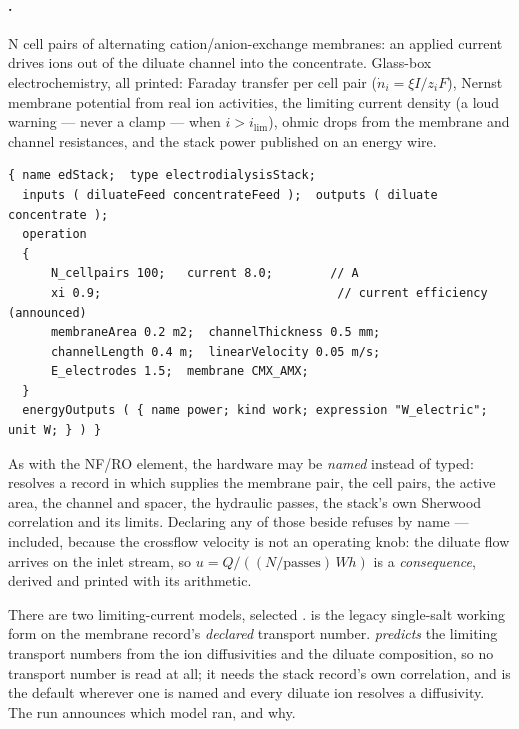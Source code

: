 \documentclass[11pt,a4paper]{article}
\begin{document}
\paragraph{.}  N cell pairs of alternating
cation/anion-exchange membranes: an applied current drives ions out of
the diluate channel into the concentrate.  Glass-box electrochemistry,
all printed: Faraday transfer per cell pair ($\dot n_i = \xi I / z_i F$),
Nernst membrane potential from real ion activities, the limiting
current density (a loud warning --- never a clamp --- when
$i > i_{\lim}$), ohmic drops from the membrane and channel resistances,
and the stack power published on an energy wire.

\begin{lstlisting}[language=dict]
{ name edStack;  type electrodialysisStack;
  inputs ( diluateFeed concentrateFeed );  outputs ( diluate concentrate );
  operation
  {
      N_cellpairs 100;   current 8.0;        // A
      xi 0.9;                                 // current efficiency (announced)
      membraneArea 0.2 m2;  channelThickness 0.5 mm;
      channelLength 0.4 m;  linearVelocity 0.05 m/s;
      E_electrodes 1.5;  membrane CMX_AMX;
  }
  energyOutputs ( { name power; kind work; expression "W_electric"; unit W; } ) }
\end{lstlisting}

As with the NF/RO element, the hardware may be \emph{named} instead of
typed:  resolves a  record in
 which supplies the membrane pair, the cell
pairs, the active area, the channel and spacer, the hydraulic passes,
the stack's own Sherwood correlation and its limits.  Declaring any of
those beside  refuses by name --- 
included, because the crossflow velocity is not an operating knob: the
diluate flow arrives on the inlet stream, so
$u = Q/((N/\text{passes})\,W h)$ is a \emph{consequence}, derived and
printed with its arithmetic.

There are two limiting-current models, selected
.   is the
legacy single-salt working form on the membrane record's \emph{declared}
transport number.   \emph{predicts} the
limiting transport numbers from the ion diffusivities and the diluate
composition, so no transport number is read at all; it needs the stack
record's own correlation, and is the default wherever one is named and
every diluate ion resolves a diffusivity.  The run announces which model
ran, and why.
\end{document}
